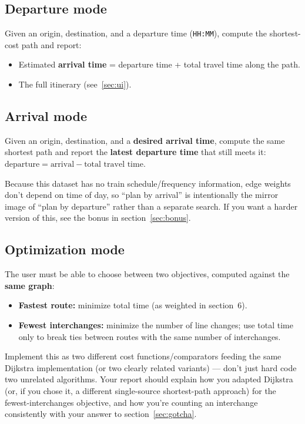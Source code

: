 \documentclass[11pt,a4paper]{article}
\begin{document}
\subsection{Departure mode}
Given an origin, destination, and a departure time (\texttt{HH:MM}),
compute the shortest-cost path and report:
\begin{itemize}
  \item Estimated \textbf{arrival time} = departure time + total travel
        time along the path.
  \item The full itinerary (see~\ref{sec:ui}).
\end{itemize}

\subsection{Arrival mode}
Given an origin, destination, and a \textbf{desired arrival time}, compute
the same shortest path and report the \textbf{latest departure time} that
still meets it: $\text{departure} = \text{arrival} - \text{total travel
time}$.

\begin{gotcha}[Note]
Because this dataset has no train schedule/frequency information, edge
weights don't depend on time of day, so ``plan by arrival'' is
intentionally the mirror image of ``plan by departure'' rather than a
separate search. If you want a harder version of this, see the bonus in
section~\ref{sec:bonus}.
\end{gotcha}

\subsection{Optimization mode}
\label{sec:optmode}
The user must be able to choose between two objectives, computed against
the \textbf{same graph}:
\begin{itemize}
  \item \textbf{Fastest route:} minimize total time (as weighted in
        section~6).
  \item \textbf{Fewest interchanges:} minimize the number of line changes;
        use total time only to break ties between routes with the same
        number of interchanges.
\end{itemize}
Implement this as two different cost functions/comparators feeding the
same Dijkstra implementation (or two clearly related variants) --- don't
just hard code two unrelated algorithms. Your report should explain how
you adapted Dijkstra (or, if you chose it, a different single-source
shortest-path approach) for the fewest-interchanges objective, and how
you're counting an interchange consistently with your answer to
section~\ref{sec:gotcha}.
\end{document}
